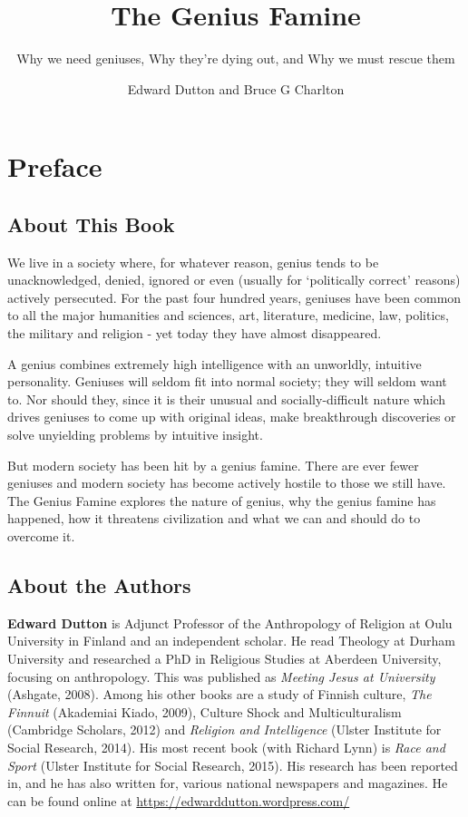 \documentclass[
]{book}
\title{The Genius Famine}
\subtitle{Why we need geniuses, Why they're dying out, and Why we must rescue them}
\author{Edward Dutton and Bruce G Charlton}
\date{}
\begin{document}
\maketitle

{
\setcounter{tocdepth}{1}
\tableofcontents
}
\hypertarget{preface}{%
\chapter*{Preface}\label{preface}}

\hypertarget{about-this-book}{%
\section*{About This Book}\label{about-this-book}}

We live in a society where, for whatever reason, genius tends to be unacknowledged, denied, ignored or even (usually for `politically correct' reasons) actively persecuted. For the past four hundred years, geniuses have been common to all the major humanities and sciences, art, literature, medicine, law, politics, the military and religion - yet today they have almost disappeared.

A genius combines extremely high intelligence with an unworldly, intuitive personality. Geniuses will seldom fit into normal society; they will seldom want to. Nor should they, since it is their unusual and socially-difficult nature which drives geniuses to come up with original ideas, make breakthrough discoveries or solve unyielding problems by intuitive insight.

But modern society has been hit by a genius famine. There are ever fewer geniuses and modern society has become actively hostile to those we still have. The Genius Famine explores the nature of genius, why the genius famine has happened, how it threatens civilization and what we can and should do to overcome it.

\hypertarget{about-the-authors}{%
\section*{About the Authors}\label{about-the-authors}}

\textbf{Edward Dutton} is Adjunct Professor of the Anthropology of Religion at Oulu University in Finland and an independent scholar. He read Theology at Durham University and researched a PhD in Religious Studies at Aberdeen University, focusing on anthropology. This was published as \emph{Meeting Jesus at University} (Ashgate, 2008). Among his other books are a study of Finnish culture, \emph{The Finnuit} (Akademiai Kiado, 2009), Culture Shock and Multiculturalism (Cambridge Scholars, 2012) and \emph{Religion and Intelligence} (Ulster Institute for Social Research, 2014). His most recent book (with Richard Lynn) is \emph{Race and Sport} (Ulster Institute for Social Research, 2015). His research has been reported in, and he has also written for, various national newspapers and magazines. He can be found online at \url{https://edwarddutton.wordpress.com/}
\end{document}

